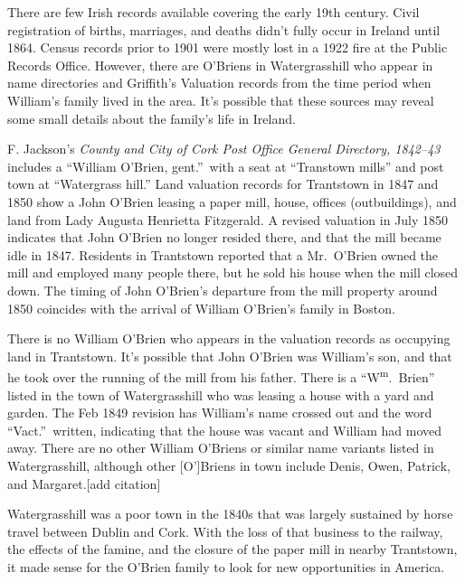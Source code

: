 There are few Irish records available covering the early 19th century. Civil registration of births, marriages, and deaths didn't fully occur in Ireland until 1864.\citep{Grenham1} Census records prior to 1901 were mostly lost in a 1922 fire at the Public Records Office.\citep{Grenham18} However, there are O'Briens in Watergrasshill who appear in name directories and Griffith's Valuation records from the time period when William's family lived in the area. It's possible that these sources may reveal some small details about the family's life in Ireland.

F. Jackson's \textit{County and City of Cork Post Office General Directory, 1842--43} includes a ``William O'Brien, gent.''\ with a seat at ``Transtown mills'' and post town at ``Watergrass hill.''\citep{Jacksons} Land valuation records for Trantstown in 1847 and 1850 show a John O'Brien leasing a paper mill, house, offices (outbuildings), and land from Lady Augusta Henrietta Fitzgerald.\citep{Peramb1847,Peramb1850} A revised valuation in July 1850 indicates that John O'Brien no longer resided there, and that the mill became idle in 1847.\citep{House1850} Residents in Trantstown reported that a Mr.\ O'Brien owned the mill and employed many people there, but he sold his house when the mill closed down.\citep{PaperMill} The timing of John O'Brien's departure from the mill property around 1850 coincides with the arrival of William O'Brien's family in Boston.

There is no William O'Brien who appears in the valuation records as occupying land in Trantstown. It's possible that John O'Brien was William's son, and that he took over the running of the mill from his father. There is a ``W\textsuperscript{m}.\ Brien'' listed in the town of Watergrasshill who was leasing a house with a yard and garden. The Feb 1849 revision has William's name crossed out and the word ``Vact.''\ written, indicating that the house was vacant and William had moved away.\citep{House1849} There are no other William O'Briens or similar name variants listed in Watergrasshill, although other [O']Briens in town include Denis, Owen, Patrick, and Margaret.[add citation]

Watergrasshill was a poor town in the 1840s that was largely sustained by horse travel between Dublin and Cork. With the loss of that business to the railway, the effects of the famine, and the closure of the paper mill in nearby Trantstown, it made sense for the O'Brien family to look for new opportunities in America.



